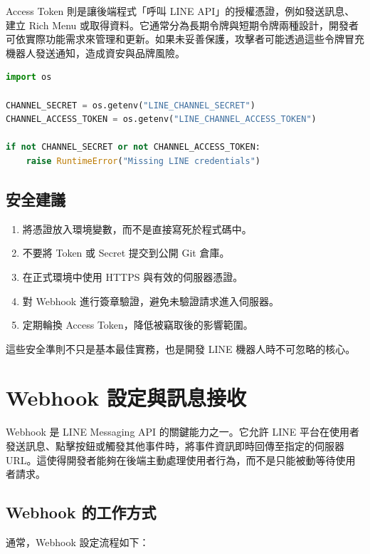Access Token 則是讓後端程式「呼叫 LINE API」的授權憑證，例如發送訊息、建立 Rich Menu 或取得資料。它通常分為長期令牌與短期令牌兩種設計，開發者可依實際功能需求來管理和更新。如果未妥善保護，攻擊者可能透過這些令牌冒充機器人發送通知，造成資安與品牌風險。

\begin{lstlisting}[language=Python, caption={以環境變數方式儲存 LINE 認證資訊}, label={lst:secure}]
import os

CHANNEL_SECRET = os.getenv("LINE_CHANNEL_SECRET")
CHANNEL_ACCESS_TOKEN = os.getenv("LINE_CHANNEL_ACCESS_TOKEN")

if not CHANNEL_SECRET or not CHANNEL_ACCESS_TOKEN:
    raise RuntimeError("Missing LINE credentials")
\end{lstlisting}

\section{安全建議}

\begin{enumerate}[leftmargin=2em]
    \item 將憑證放入環境變數，而不是直接寫死於程式碼中。
    \item 不要將 Token 或 Secret 提交到公開 Git 倉庫。
    \item 在正式環境中使用 HTTPS 與有效的伺服器憑證。
    \item 對 Webhook 進行簽章驗證，避免未驗證請求進入伺服器。
    \item 定期輪換 Access Token，降低被竊取後的影響範圍。
\end{enumerate}

這些安全準則不只是基本最佳實務，也是開發 LINE 機器人時不可忽略的核心。

\chapter{Webhook 設定與訊息接收}

Webhook 是 LINE Messaging API 的關鍵能力之一。它允許 LINE 平台在使用者發送訊息、點擊按鈕或觸發其他事件時，將事件資訊即時回傳至指定的伺服器 URL。這使得開發者能夠在後端主動處理使用者行為，而不是只能被動等待使用者請求。

\section{Webhook 的工作方式}

通常，Webhook 設定流程如下：

